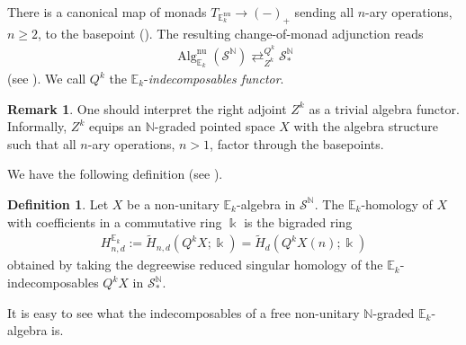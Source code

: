 \documentclass[12pt, reqno]{amsart}
\theoremstyle{plain}
\theoremstyle{definition}
\newtheorem{definition}[theorem]{Definition}
\newtheorem{remark}[theorem]{Remark}
\newcommand{\N}{\mathbb N}
\begin{document}
There is a canonical map of monads $T_{\mathbb{E}_k^{\operatorname{nu}}}\rightarrow (-)_+$ sending all $n$-ary operations, $n\geq 2$, to the basepoint (\cite{GalatiusKupersRandalWilliams}). The resulting change-of-monad adjunction reads
\begin{align*}
\operatorname{Alg}_{\mathbb{E}_k}^{\operatorname{nu}}(\mathcal{S}^\N)\mathop{\rightleftarrows}^{Q^k}_{Z^k} \mathcal{S}_*^\N
\end{align*}
(see \cite[Proposition 4.6.2.17]{LurieHA}). We call $Q^k$ the $\mathbb{E}_k$-\textit{indecomposables functor}.

\begin{remark}
One should interpret the right adjoint $Z^k$ as a trivial algebra functor. Informally, $Z^k$ equips an $\N$-graded pointed space $X$ with the algebra structure such that all $n$-ary operations, $n>1$, factor through the basepoints.
\end{remark}

We have the following definition (see \cite[Definition 10.7]{GalatiusKupersRandalWilliams}).

\begin{definition}
Let $X$ be a non-unitary $\mathbb{E}_k$-algebra in $\mathcal{S}^\N$. The $\mathbb{E}_k$-homology of $X$ with coefficients in a commutative ring $\Bbbk$ is the bigraded ring
\begin{align*}
H^{\mathbb{E}_k}_{n,d}:=\tilde{H}_{n,d}(Q^kX;\Bbbk)=\tilde{H}_d(Q^kX(n);\Bbbk)
\end{align*}
obtained by taking the degreewise reduced singular homology of the $\mathbb{E}_k$-indecomposables $Q^kX$ in $\mathcal{S}_\ast^\N$.
\end{definition}

It is easy to see what the indecomposables of a free non-unitary $\N$-graded $\mathbb{E}_k$-algebra is.
\end{document}
